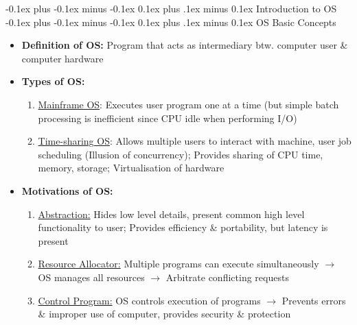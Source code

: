 \documentclass[landscape]{article}
\makeatletter
\renewcommand{\section}{\@startsection{section}{1}{0mm}%
  {-0.1ex plus -0.1ex minus -0.1ex}%
  {0.1ex plus .1ex minus 0.1ex}%
{\normalfont\small\bfseries}}
\renewcommand{\subsection}{\@startsection{subsection}{2}{0mm}%
  {-0.1ex plus -0.1ex minus -0.1ex}%
  {0.1ex plus .1ex minus 0.1ex}%
{\normalfont\scriptsize\bfseries}}
\makeatother
\begin{document}
\raggedright
\tiny
\begin{multicols*}{5}
    \setlength{\columnseprule}{0.25pt}

    \begin{tightcenter}
    \end{tightcenter}
    
    \section{Introduction to OS}
    \subsection{OS Basic Concepts}
    \begin{itemize}
      \item \textbf{Definition of OS:} Program that acts as intermediary btw. computer user \& computer hardware
      \item \textbf{Types of OS:}
      \begin{enumerate}
        \item \underline{Mainframe OS}: Executes user program one at a time (but simple batch processing is inefficient since CPU idle when performing I/O)
        \item \underline{Time-sharing OS}: Allows multiple users to interact with machine, user job scheduling (Illusion of concurrency); Provides sharing of CPU time, memory, storage; Virtualisation of hardware 
      \end{enumerate}
      \item \textbf{Motivations of OS:}
      \begin{enumerate}
        \item \underline{Abstraction:} Hides low level details, present common high level functionality to user; Provides efficiency \& portability, but latency is present
        \item \underline{Resource Allocator:} Multiple programs can execute simultaneously $\rightarrow$ OS manages all resources $\rightarrow$ Arbitrate conflicting requests
        \item \underline{Control Program:} OS controls execution of programs $\rightarrow$ Prevents errors \& improper use of computer, provides security \& protection
      \end{enumerate}
    \end{itemize}


\end{multicols*}
\end{document}
